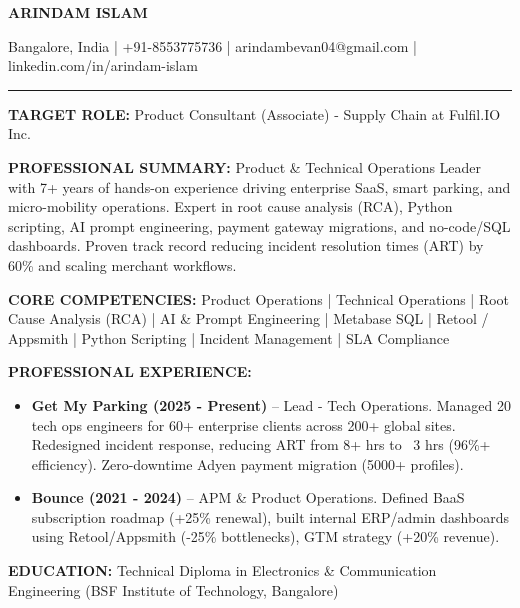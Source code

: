 \documentclass[a4paper,10pt]{article}
\begin{document}
\centerline{\Large \bfseries ARINDAM ISLAM}
\centerline{Bangalore, India | +91-8553775736 | arindambevan04@gmail.com | linkedin.com/in/arindam-islam}
\vspace{2mm}
\hrule
\vspace{2mm}
\textbf{TARGET ROLE:} Product Consultant (Associate) - Supply Chain at Fulfil.IO Inc.

\vspace{2mm}
\textbf{PROFESSIONAL SUMMARY:} Product \& Technical Operations Leader with 7+ years of hands-on experience driving enterprise SaaS, smart parking, and micro-mobility operations. Expert in root cause analysis (RCA), Python scripting, AI prompt engineering, payment gateway migrations, and no-code/SQL dashboards. Proven track record reducing incident resolution times (ART) by 60\% and scaling merchant workflows.

\vspace{2mm}
\textbf{CORE COMPETENCIES:} Product Operations | Technical Operations | Root Cause Analysis (RCA) | AI \& Prompt Engineering | Metabase SQL | Retool / Appsmith | Python Scripting | Incident Management | SLA Compliance

\vspace{2mm}
\textbf{PROFESSIONAL EXPERIENCE:}
\begin{itemize}
  \item \textbf{Get My Parking (2025 - Present)} -- Lead - Tech Operations. Managed 20 tech ops engineers for 60+ enterprise clients across 200+ global sites. Redesigned incident response, reducing ART from 8+ hrs to ~3 hrs (96\%+ efficiency). Zero-downtime Adyen payment migration (5000+ profiles).
  \item \textbf{Bounce (2021 - 2024)} -- APM \& Product Operations. Defined BaaS subscription roadmap (+25\% renewal), built internal ERP/admin dashboards using Retool/Appsmith (-25\% bottlenecks), GTM strategy (+20\% revenue).
\end{itemize}

\vspace{2mm}
\textbf{EDUCATION:} Technical Diploma in Electronics \& Communication Engineering (BSF Institute of Technology, Bangalore)
\end{document}
